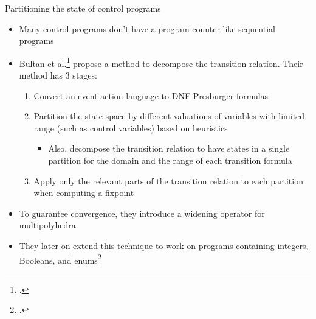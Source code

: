 \documentclass[aspectratio=169,notes]{beamer}
\begin{document}
\begin{frame}{Partitioning the state of control programs}\small
  \begin{itemize}[<+->]
  \item Many control programs don't have a program counter like sequential programs
  \item Bultan et al.\footcite{bultan_model-checking_1999} propose a method to decompose the transition relation. Their method has 3 stages:
    \begin{enumerate}
    \item Convert an event-action language to DNF Presburger formulas
    \item Partition the state space by different valuations of variables with limited range (such as control variables) based on heuristics
      \begin{itemize}
      \item Also, decompose the transition relation to have states in a single partition for the domain and the range of each transition formula
      \end{itemize}

    \item Apply only the relevant parts of the transition relation to each partition when computing a fixpoint
    \end{enumerate}
  \item To guarantee convergence, they introduce a widening operator for multipolyhedra
  \item They later on extend this technique to work on programs containing integers, Booleans, and enums\footcite{bultan_composite_2000}
  \end{itemize}
\end{frame}
\end{document}
